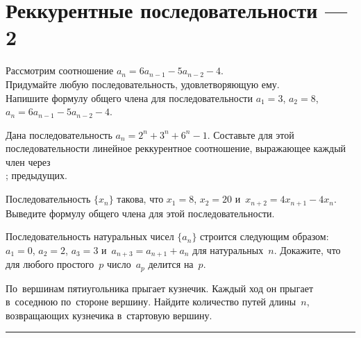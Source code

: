 

\section*{Реккурентные последовательности --- 2}


\begin{problems}

\item
Рассмотрим соотношение $a_n = 6 a_{n-1} - 5 a_{n-2} - 4$.
\\
\subproblem
Придумайте любую последовательность, удовлетворяющую ему.
\\
\subproblem
Напишите формулу общего члена для последовательности
$a_1 = 3$, $a_2 = 8$, $a_n = 6 a_{n-1} - 5 a_{n-2} - 4$.

\item
Дана последовательность $a_n = 2^n + 3^n + 6^n - 1$.
Составьте для этой последовательности линейное реккурентное соотношение,
выражающее каждый член через
\\
;
\quad
{}
\quad
предыдущих.

\item
Последовательность $\{ x_n \}$ такова, что
$x_1 = 8$, $x_2 = 20$ и~$x_{n+2} = 4 x_{n+1} - 4 x_n$.
Выведите формулу общего члена для этой последовательности.

\item
Последовательность натуральных чисел $\{ a_{n} \}$ строится следующим образом:
$a_1 = 0$, $a_2 = 2$, $a_3 = 3$ и~$a_{n+3} = a_{n+1} + a_n$ для
натуральных~$n$.
Докажите, что для любого простого~$p$ число~$a_p$ делится на~$p$.

\item
По~вершинам пятиугольника прыгает кузнечик.
Каждый ход он прыгает в~соседнюю по~стороне вершину.
Найдите количество путей длины~$n$, возвращающих кузнечика в~стартовую
вершину.

\end{problems}


\rule[0.5ex]{\textwidth}{0.5pt}


